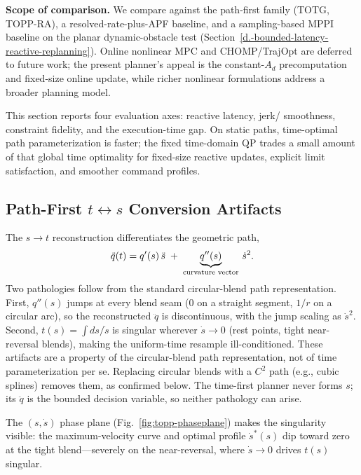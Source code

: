 \textbf{Scope of comparison.} We compare against the path-first family
(TOTG, TOPP-RA), a resolved-rate-plus-APF baseline, and a sampling-based
MPPI baseline on the planar dynamic-obstacle test
(Section~\ref{d.-bounded-latency-reactive-replanning}). Online nonlinear MPC
and CHOMP/TrajOpt are deferred to future work; the present planner's appeal
is the constant-\(A_d\) precomputation and fixed-size online update, while
richer nonlinear formulations address a broader planning model.

This section reports four evaluation axes: reactive latency, jerk/
smoothness, constraint fidelity, and the execution-time gap. On static
paths, time-optimal path parameterization is faster; the fixed time-domain
QP trades a small amount of that global time optimality for fixed-size reactive
updates, explicit limit satisfaction, and smoother command profiles.

\subsection{\texorpdfstring{Path-First \(t\!\leftrightarrow\!s\)
Conversion Artifacts}{Path-First t-s Conversion Artifacts}}\label{a.-path-first-tleftrightarrows-conversion-artifacts}

The \(s\!\to\!t\) reconstruction differentiates the geometric path,
\[\eqfit{\ddot q(t) = q'(s)\,\ddot s \;+\; \underbrace{q''(s)}_{\text{curvature vector}}\,\dot s^2 .}\]
Two pathologies follow from the standard circular-blend path
representation. First, \(q''(s)\) jumps at every blend seam (\(0\) on a
straight segment, \(1/r\) on a circular arc), so the reconstructed
\(\ddot q\) is discontinuous, with the jump scaling as \(\dot s^2\).
Second, \(t(s)=\int ds/\dot s\) is singular wherever \(\dot s \to 0\)
(rest points, tight near-reversal blends), making the uniform-time
resample ill-conditioned. These artifacts are a property of the
circular-blend path representation, not of time parameterization per se.
Replacing circular blends with a \(C^2\) path (e.g., cubic splines)
removes them, as confirmed below. The time-first planner never forms
\(s\); its \(\ddot q\) is the bounded decision variable, so neither
pathology can arise.

The \((s,\dot s)\) phase plane (Fig.~\ref{fig:topp-phaseplane}) makes the singularity visible:
the maximum-velocity curve and optimal profile \(\dot s^*(s)\) dip
toward zero at the tight blend---severely on the near-reversal, where
\(\dot s\to0\) drives \(t(s)\) singular.

